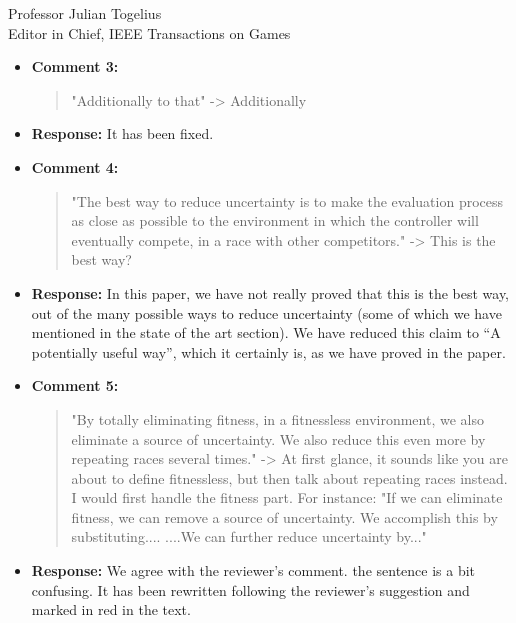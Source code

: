 \documentclass[10pt]{letter} %
\begin{document}
\begin{letter}{Professor Julian Togelius \\ Editor in Chief, IEEE Transactions on Games}
\begin{enumerate}
\begin{itemize}
	
		\item {\bf Comment 3:}
			\begin{quote}
				"Additionally to that" -> Additionally
			\end{quote}	
		\item {\bf Response:} 
			It has been fixed.
		\item {\bf Comment 4:}
			\begin{quote}
				"The best way to reduce uncertainty is to make the evaluation process as close as possible to the environment in which the controller will eventually compete, in a race with other competitors." -> This is the best way?
			\end{quote}	
		\item {\bf Response:} 
                  In this paper, we have not really proved that this
                  is the best way, out of the many possible ways to reduce
                  uncertainty (some of which we have mentioned in the
                  state of the art section). We have reduced this
                  claim to ``A potentially useful way'', which it
                  certainly is, as we have proved in the paper.
		\item {\bf Comment 5:}
			\begin{quote}
				"By totally eliminating fitness, in a fitnessless environment, we also eliminate a source of uncertainty. We also reduce this even more by repeating races several times." -> At first glance, it sounds like you are about to define fitnessless, but then talk about repeating races instead. I would first handle the fitness part. For instance: "If we can eliminate fitness, we can remove a source of uncertainty. We accomplish this by substituting.... ....We can further reduce uncertainty by..."
			\end{quote}
		\item {\bf Response:}
				We agree with the reviewer's comment. the sentence is a bit confusing. It has been rewritten following the reviewer's suggestion and marked in red in the text.


\end{itemize}
\end{enumerate}
\end{letter}
\end{document}
